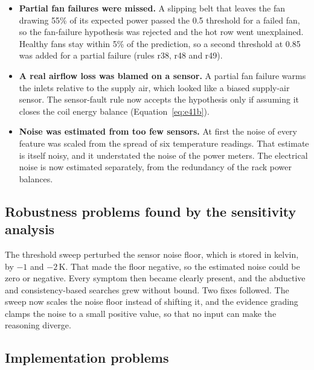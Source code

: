 \begin{itemize}
  \item \textbf{Partial fan failures were missed.} A slipping belt that leaves the fan drawing 55\% of its expected power passed the 0.5 threshold for a failed fan, so the fan-failure hypothesis was rejected and the hot row went unexplained. Healthy fans stay within 5\% of the prediction, so a second threshold at 0.85 was added for a partial failure (rules r38, r48 and r49).
  \item \textbf{A real airflow loss was blamed on a sensor.} A partial fan failure warms the inlets relative to the supply air, which looked like a biased supply-air sensor. The sensor-fault rule now accepts the hypothesis only if assuming it closes the coil energy balance (Equation~\eqref{eq:e41b}).
  \item \textbf{Noise was estimated from too few sensors.} At first the noise of every feature was scaled from the spread of six temperature readings. That estimate is itself noisy, and it understated the noise of the power meters. The electrical noise is now estimated separately, from the redundancy of the rack power balances.
\end{itemize}

\subsection{Robustness problems found by the sensitivity analysis}

The threshold sweep perturbed the sensor noise floor, which is stored in kelvin, by $-1$ and $-2$\,K. That made the floor negative, so the estimated noise could be zero or negative. Every symptom then became clearly present, and the abductive and consistency-based searches grew without bound. Two fixes followed. The sweep now scales the noise floor instead of shifting it, and the evidence grading clamps the noise to a small positive value, so that no input can make the reasoning diverge.

\subsection{Implementation problems}

